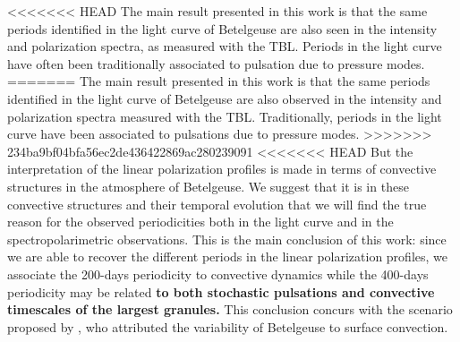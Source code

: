 \documentclass{aa}
\begin{document}
<<<<<<< HEAD
The main result  presented in this work is that the same periods identified in the light curve of Betelgeuse are also seen in the intensity and polarization
spectra, as measured with the TBL. Periods in the light curve have often been traditionally associated to pulsation due to pressure modes.
=======
The main result presented in this work is that the same periods identified in the light curve of Betelgeuse are also observed in the intensity and polarization
spectra measured with the TBL. Traditionally, periods in the light curve have been associated to pulsations due to pressure modes.
>>>>>>> 234ba9bf04bfa56ec2de436422869ac280239091
<<<<<<< HEAD
But the interpretation of the linear polarization profiles is made in terms of convective structures in the atmosphere of Betelgeuse. We suggest 
that it is in these convective structures and their temporal evolution that we will find the true reason for the observed periodicities both 
in the light curve and in the spectropolarimetric observations. This is the main conclusion of this work: since we are able to recover the different periods in the linear polarization profiles, 
we associate the 200-days periodicity to convective dynamics while the 400-days periodicity may be related \textbf{to both stochastic pulsations and convective timescales of the largest granules.} 
This conclusion concurs with the scenario proposed by \cite{gray_mass_2008}, who attributed the variability of Betelgeuse to surface convection. 
\end{document}
